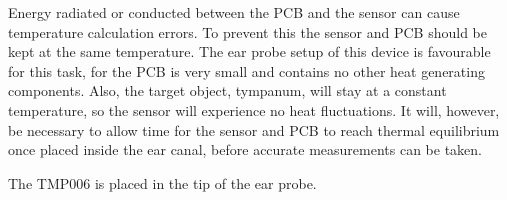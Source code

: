 \medskip

Energy radiated or conducted between the PCB and the sensor can cause temperature calculation errors. To prevent this the sensor and PCB should be kept at the same temperature. The ear probe setup of this device is favourable for this task, for the PCB is very small and contains no other heat generating components. Also, the target object, tympanum, will stay at a constant temperature, so the sensor will experience no heat fluctuations. It will, however, be necessary to allow time for the sensor and PCB to reach thermal equilibrium once placed inside the ear canal, before accurate measurements can be taken.

\medskip

The TMP006 is placed in the tip of the ear probe. 
